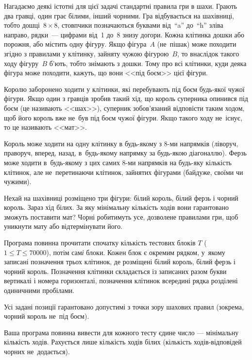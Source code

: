 ﻿Нагадаємо деякі істотні для цієї задачі стандартні правила гри
в шахи. Грають два гравці, один грає білими, інший чорними.
Гра відбувається на шахівниці, тобто дошці~${8\times8}$, стовпчики позначаються буквами
від~``a'' до~``h'' зліва направо, рядки~--- цифрами від~1 до~8 знизу догори.
Кожна клітинка дошки або порожня, або містить одну фігуру.
Якщо фігура~$A$ (не~пішак) може походити згідно з правилами у клітинку,
зайняту чужою фігурою~$B$, то внаслідок такого ходу фігуру~$B$ б'ють,
тобто знімають з дошки.
Тому про всі клітинки, куди деяка фігура може походити, кажуть,
що вони <<під боєм>> цієї фігури.

Королю заборонено ходити у клітинки, які перебувають під боєм будь-якої чужої фігури. 
Якщо один з гравців зробив такий хід, що король суперника опинився під боєм
(це називають <<шах>>),
суперник зобов'язаний відповісти таким ходом, щоб його король вже не~був під боєм чужої фігури. 
Якщо такого ходу не~існує, то це називають <<мат>>.

Король може ходити на одну клітинку в будь-якому з 8-ми напрямків
(ліворуч, праворуч, вперед, назад, в~будь-якому напрямку за будь-якою діагоналлю).
Ферзь може ходити в~будь-якому з цих самих 8-ми напрямків на будь-яку
кількість клітинок, але не~перетинаючи клітинок, зайнятих фігурами 
(байдуже, своїми чи чужими).

Нехай на шахівниці розміщено три фігури: білий король, білий ферзь і
чорний король. Зараз хід білих. За яку мінімальну кількість ходів вони
гарантовано зможуть поставити мат? Чорні робитимуть усе, дозволене
правилами гри, щоб уникнути мату або відтермінувати його.


\InputFile

Програма повинна прочитати спочатку кількість тестових блоків 
$T$ ($1\leqslant T\leqslant 70000$),
потім сам{\it і} блоки. Кожен блок є окремим рядком, у~якому записані
позначення трьох клітинок, де розміщені білий король, білий ферзь і чорний король.
Позначення клітинки складається із записаних разом букви вертикалі і номера горизонталі, позначення клітинок всередині рядка розділені одиничними пробілами.

Усі задані позиції гарантовано допустимі з точки зору шахових правил (зокрема, чорний король не~під боєм).


\OutputFile

Ваша програма повинна вивести для кожного тесту єдине число --- мінімальну кількість ходів. 
Рахується лише кількість ходів білих (кількість ходів-відповідей чорних не~додається).


\Examples

\begin{example}%
%
\end{example}
